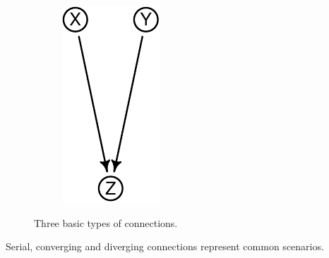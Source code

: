 \documentclass[
  10pt,
  dvipsnames,enabledeprecatedfontcommands]{scrartcl}
\begin{document}
\begin{figure}[H]
{\begin{subfigure}[!ht]{0.32\textwidth}
\begin{center}\includegraphics[width=0.75\linewidth]{conjunction-appendix14_files/figure-latex/unnamed-chunk-4-1} \end{center}
\end{subfigure}}
\normalsize
\caption{Three basic types of connections.}
\label{fig:connectionsBN}
\end{figure}

\noindent Serial, converging and diverging connections represent common
scenarios.
\end{document}
